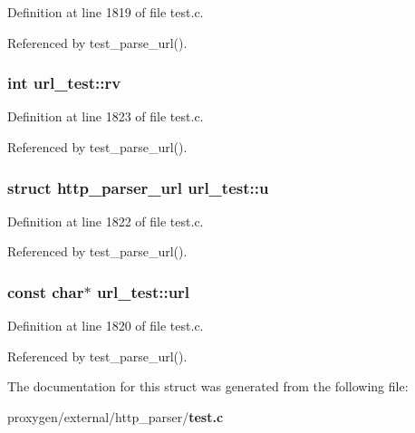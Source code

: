 Definition at line 1819 of file test.\+c.



Referenced by test\+\_\+parse\+\_\+url().

\subsubsection[{rv}]{\setlength{\rightskip}{0pt plus 5cm}int url\+\_\+test\+::rv}\label{structurl__test_af4b13d25dd2bdaf699f3a357ea5628ba}


Definition at line 1823 of file test.\+c.



Referenced by test\+\_\+parse\+\_\+url().

\subsubsection[{u}]{\setlength{\rightskip}{0pt plus 5cm}struct {\bf http\+\_\+parser\+\_\+url} url\+\_\+test\+::u}\label{structurl__test_a62b64c89b9eba5965e2b6f1f08a415c2}


Definition at line 1822 of file test.\+c.



Referenced by test\+\_\+parse\+\_\+url().

\subsubsection[{url}]{\setlength{\rightskip}{0pt plus 5cm}const char$\ast$ url\+\_\+test\+::url}\label{structurl__test_a7d66f9c44889c27136b489037557a2b7}


Definition at line 1820 of file test.\+c.



Referenced by test\+\_\+parse\+\_\+url().



The documentation for this struct was generated from the following file\+:\begin{DoxyCompactItemize}
\item 
proxygen/external/http\+\_\+parser/{\bf test.\+c}\end{DoxyCompactItemize}
